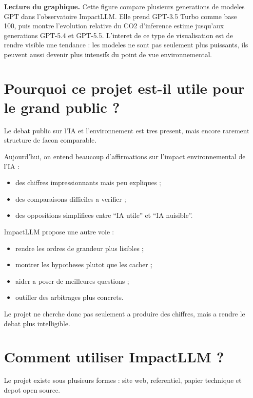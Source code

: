 \documentclass[11pt,a4paper]{article}
\newcommand{\sectionlead}[1]{%
  \noindent\colorbox{emotiaLightBlue}{%
    \parbox{\dimexpr\textwidth-2\fboxsep}{\small #1}%
  }\par
  \vspace{0.45em}
}
\begin{document}
\small
\textbf{Lecture du graphique.} Cette figure compare plusieurs generations de modeles GPT dans l'observatoire ImpactLLM. Elle prend GPT-3.5 Turbo comme base 100, puis montre l'evolution relative du CO2 d'inference estime jusqu'aux generations GPT-5.4 et GPT-5.5. L'interet de ce type de visualisation est de rendre visible une tendance : les modeles ne sont pas seulement plus puissants, ils peuvent aussi devenir plus intensifs du point de vue environnemental.
\normalsize

\section{Pourquoi ce projet est-il utile pour le grand public ?}
\sectionlead{Le debat public sur l'IA et l'environnement est tres present, mais encore rarement structure de facon comparable.}

Aujourd'hui, on entend beaucoup d'affirmations sur l'impact environnemental de l'IA :
\begin{itemize}
  \item des chiffres impressionnants mais peu expliques ;
  \item des comparaisons difficiles a verifier ;
  \item des oppositions simplifiees entre ``IA utile'' et ``IA nuisible''.
\end{itemize}

ImpactLLM propose une autre voie :
\begin{itemize}
  \item rendre les ordres de grandeur plus lisibles ;
  \item montrer les hypotheses plutot que les cacher ;
  \item aider a poser de meilleures questions ;
  \item outiller des arbitrages plus concrets.
\end{itemize}

Le projet ne cherche donc pas seulement a produire des chiffres, mais a rendre le debat plus intelligible.

\section{Comment utiliser ImpactLLM ?}
\sectionlead{Le projet existe sous plusieurs formes : site web, referentiel, papier technique et depot open source.}
\end{document}
